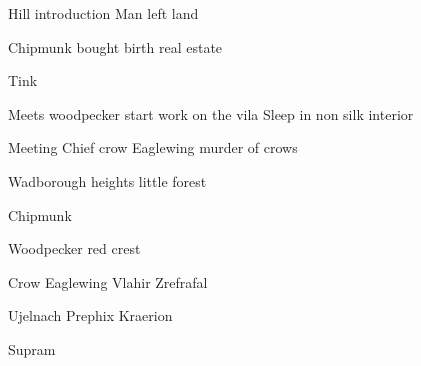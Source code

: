 \documentclass[smalldemyvopaper,11pt,twoside,onecolumn,openright,extrafontsizes]{memoir}
\begin{document}
\vspace*{4.3cm}
\begin{localsize}{10}
	\begin{quote}
	\end{quote} 
\end{localsize}
\vspace{1cm}


\newpage
 Hill introduction Man left land

 Chipmunk bought birth real estate
 
 Tink

 Meets woodpecker start work on the vila
 Sleep in non silk interior

Meeting Chief crow Eaglewing murder of crows

Wadborough heights little forest 

Chipmunk 

Woodpecker 
red crest

Crow Eaglewing
Vlahir
Zrefrafal

Ujelnach
Prephix
Kraerion

Supram

\end{document}
